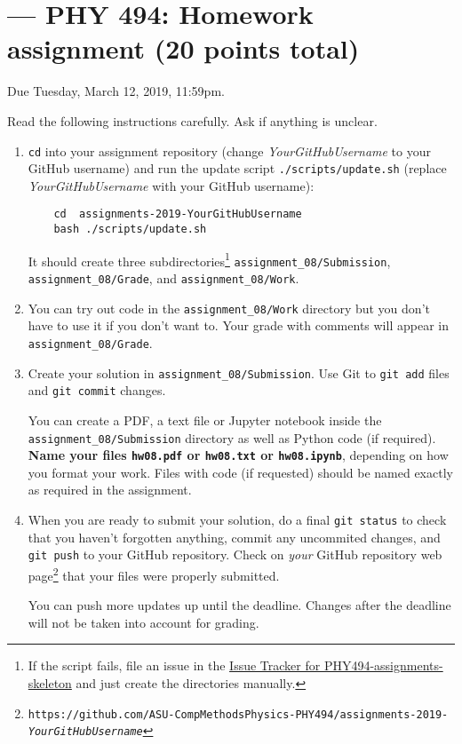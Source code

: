 \documentclass[letterpaper]{scrartcl}
\newcommand{\anumber}{8}
\newcommand{\anum}{0\anumber}
\begin{document}

\setcounter{section}{\anumber}
\addtocounter{section}{-1}
\section{ --- PHY 494: Homework assignment (20 points total)}

\noindent Due Tuesday, March 12, 2019, 11:59pm.

\noindent
Read the following instructions carefully. Ask if anything is unclear.
\begin{enumerate}
\item \texttt{cd} into your assignment repository (change
  \emph{YourGitHubUsername} to your GitHub username) and run the
  update script \texttt{./scripts/update.sh} (replace
  \emph{YourGitHubUsername} with your GitHub username):
  \begin{verbatim}
    cd  assignments-2019-YourGitHubUsername
    bash ./scripts/update.sh
  \end{verbatim}
  It should create three subdirectories\footnote{If the script fails,
    file an issue in the
    \href{https://github.com/ASU-CompMethodsPhysics-PHY494/PHY494-assignments-skeleton/issues}{Issue
      Tracker for PHY494-assignments-skeleton} and just create the
    directories manually.} \texttt{assignment\_\anum/Submission},
  \texttt{assignment\_\anum/Grade}, and
  \texttt{assignment\_\anum/Work}.
\item You can try out code in the \texttt{assignment\_\anum/Work}
  directory but you don't have to use it if you don't want to. Your
  grade with comments will appear in
  \texttt{assignment\_\anum/Grade}.
\item Create your solution in
  \texttt{assignment\_\anum/Submission}. Use Git to \texttt{git
    add} files and \texttt{git commit} changes.

  You can create a PDF, a text file or Jupyter notebook inside the
  \texttt{assignment\_\anum/Submission} directory as well as Python
  code (if required). \textbf{Name your files \texttt{hw\anum.pdf} or
    \texttt{hw\anum.txt} or \texttt{hw\anum.ipynb}}, depending on how
  you format your work. Files with code (if requested) should be named
  exactly as required in the assignment.
\item When you are ready to submit your solution, do a final
  \texttt{git status} to check that you haven't forgotten anything,
  commit any uncommited changes, and \texttt{git push} to your GitHub
  repository. Check on \emph{your} GitHub repository web
  page\footnote{\texttt{https://github.com/ASU-CompMethodsPhysics-PHY494/assignments-2019-\emph{YourGitHubUsername}}}
  that your files were properly submitted.

  You can push more updates up until the deadline. Changes after the
  deadline will not be taken into account for grading.
\end{enumerate}
\end{document}

